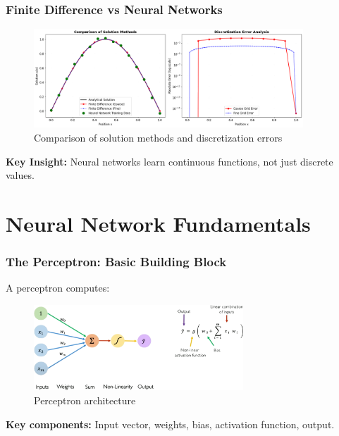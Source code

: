 \documentclass[notes]{beamer}
\begin{document}
\begin{frame}
\frametitle{Finite Difference vs Neural Networks}

\begin{figure}[ht]
	\centering
	\includegraphics[width=0.9\textwidth]{figs/fd-poisson.png}
	\caption*{Comparison of solution methods and discretization errors}
\end{figure}

\textbf{Key Insight:} Neural networks learn continuous functions, not just discrete values.

\end{frame}

\section{Neural Network Fundamentals}

\begin{frame}
\frametitle{The Perceptron: Basic Building Block}

A perceptron computes:

\begin{figure}[ht]
	\centering
	\includegraphics[width=0.7\textwidth]{figs/perceptron.png}
	\caption*{Perceptron architecture}
\end{figure}

\textbf{Key components:} Input vector, weights, bias, activation function, output.

\end{frame}
\end{document}
